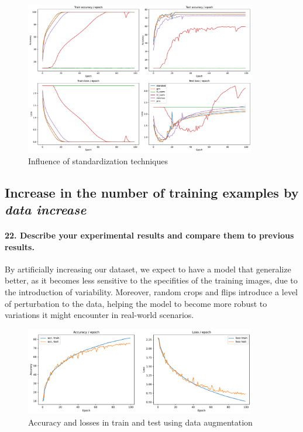 \begin{figure}[H]
    \centering
    \includegraphics*[width=0.9\textwidth]{figs/CNN/standardization_influence.pdf}
    \caption{Influence of standardization techniques}
    \label{fig:standardization_influence}
\end{figure}

\subsection{Increase in the number of training examples by \textit{data increase}}
\paragraph{22. Describe your experimental results and compare them to previous results.}

By artificially increasing our dataset, we expect to have a model that generalize better, as it becomes less sensitive to the specifities of the training images, due to the introduction of variability. Moreover, random crops and flips introduce a level of perturbation to the data, helping the model to become more robust to variations it might encounter in real-world scenarios.

\begin{figure}[H]
    \centering
    \includegraphics*[width=0.9\textwidth]{figs/CNN/dataincrease.pdf}
    \caption{Accuracy and losses in train and test using data augmentation}
    \label{fig:dataincrease}
\end{figure}

